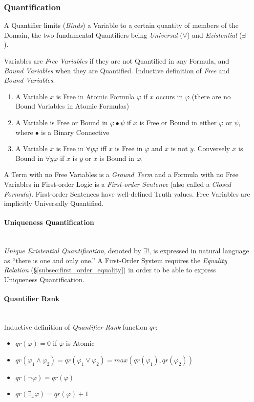 \documentclass{article}
\begin{document}
\subsubsection{Quantification}\label{subsec:firstorder_quantification}

A Quantifier limits (\emph{Binds}) a Variable to a certain quantity of
members of the Domain, the two fundamental Quantifiers being
\emph{Universal} ($\forall$) and \emph{Existential} ($\exists$).

Variables are \emph{Free Variables} if they are not Quantified in any
Formula, and \emph{Bound Variables} when they are Quantified.
Inductive definition of \emph{Free} and \emph{Bound Variables}:
\begin{enumerate}
\item A Variable $x$ is Free in Atomic Formula $\varphi$ if $x$ occurs
  in $\varphi$ (there are no Bound Variables in Atomic Formulas)
\item A Variable is Free or Bound in $\varphi \bullet \psi$ if $x$ is
  Free or Bound in either $\varphi$ or $\psi$, where $\bullet$ is a
  Binary Connective
\item A Variable $x$ is Free in $\forall y \varphi$ iff $x$ is Free in
  $\varphi$ and $x$ is not $y$. Conversely $x$ is Bound in $\forall y
  \varphi$ if $x$ is $y$ or $x$ is Bound in $\varphi$.
\end{enumerate}

A Term with no Free Variables is a \emph{Ground Term} and a Formula
with no Free Variables in First-order Logic is a \emph{First-order
  Sentence} (also called a \emph{Closed Formula}). First-order
Sentences have well-defined Truth values. Free Variables are
implicitly Universally Quantified.

\paragraph{Uniqueness Quantification}\hfill
\\
\emph{Unique Existential Quantification}, denoted by $\exists !$,
is expressed in natural language as ``there is one and only one.'' A
First-Order System requires the \emph{Equality Relation}
(\S\ref{subsec:first_order_equality}) in order to be able to express
Uniqueness Quantification.

\paragraph{Quantifier Rank}\hfill
\\
Inductive definition of \emph{Quantifier Rank} function $qr$:
\begin{itemize}
\item $qr(\varphi) = 0$ if $\varphi$ is Atomic
\item $qr(\varphi_1 \wedge \varphi_2) = qr(\varphi_1 \vee \varphi_2) = max(qr(\varphi_1),qr(\varphi_2))$
\item $qr(\neg \varphi) = qr(\varphi)$
\item $qr(\exists_x \varphi) = qr(\varphi) + 1$
\end{itemize}
\end{document}
